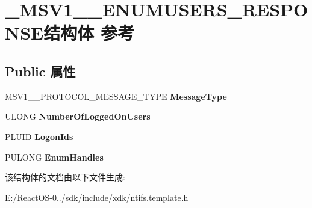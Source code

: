 \hypertarget{struct___m_s_v1__0___e_n_u_m_u_s_e_r_s___r_e_s_p_o_n_s_e}{}\section{\+\_\+\+M\+S\+V1\+\_\+\_\+\+E\+N\+U\+M\+U\+S\+E\+R\+S\+\_\+\+R\+E\+S\+P\+O\+N\+S\+E结构体 参考}
\label{struct___m_s_v1__0___e_n_u_m_u_s_e_r_s___r_e_s_p_o_n_s_e}
\subsection*{Public 属性}
\begin{DoxyCompactItemize}
\item 
\mbox{\label{struct___m_s_v1__0___e_n_u_m_u_s_e_r_s___r_e_s_p_o_n_s_e_aca48a4d76975358c63f6ae822e0fa607}} 
M\+S\+V1\+\_\+\_\+\+P\+R\+O\+T\+O\+C\+O\+L\+\_\+\+M\+E\+S\+S\+A\+G\+E\+\_\+\+T\+Y\+PE {\bfseries Message\+Type}
\item 
\mbox{\label{struct___m_s_v1__0___e_n_u_m_u_s_e_r_s___r_e_s_p_o_n_s_e_a72fbe52016c00e8c40c1891353dc9e83}} 
U\+L\+O\+NG {\bfseries Number\+Of\+Logged\+On\+Users}
\item 
\mbox{\label{struct___m_s_v1__0___e_n_u_m_u_s_e_r_s___r_e_s_p_o_n_s_e_a73ba9d432fa3e950ad0d4a355346324a}} 
\hyperlink{struct___l_u_i_d}{P\+L\+U\+ID} {\bfseries Logon\+Ids}
\item 
\mbox{\label{struct___m_s_v1__0___e_n_u_m_u_s_e_r_s___r_e_s_p_o_n_s_e_a97fbe1c093e952467dba804624cc7540}} 
P\+U\+L\+O\+NG {\bfseries Enum\+Handles}
\end{DoxyCompactItemize}


该结构体的文档由以下文件生成\+:\begin{DoxyCompactItemize}
\item 
E\+:/\+React\+O\+S-\/0../sdk/include/xdk/ntifs.\+template.\+h\end{DoxyCompactItemize}
